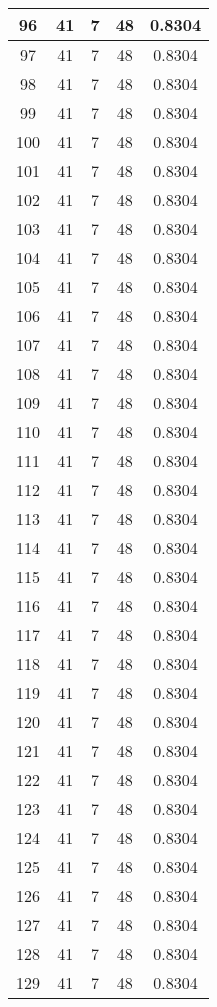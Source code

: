 \documentclass[letterpaper, 12pt]{article}
\begin{document}
\begin{longtable}{|c|c|c|c|c|}
\hline
96 & 41 & 7 & 48 & 0.8304 \\
\hline
97 & 41 & 7 & 48 & 0.8304 \\
\hline
98 & 41 & 7 & 48 & 0.8304 \\
\hline
99 & 41 & 7 & 48 & 0.8304 \\
\hline
100 & 41 & 7 & 48 & 0.8304 \\
\hline
101 & 41 & 7 & 48 & 0.8304 \\
\hline
102 & 41 & 7 & 48 & 0.8304 \\
\hline
103 & 41 & 7 & 48 & 0.8304 \\
\hline
104 & 41 & 7 & 48 & 0.8304 \\
\hline
105 & 41 & 7 & 48 & 0.8304 \\
\hline
106 & 41 & 7 & 48 & 0.8304 \\
\hline
107 & 41 & 7 & 48 & 0.8304 \\
\hline
108 & 41 & 7 & 48 & 0.8304 \\
\hline
109 & 41 & 7 & 48 & 0.8304 \\
\hline
110 & 41 & 7 & 48 & 0.8304 \\
\hline
111 & 41 & 7 & 48 & 0.8304 \\
\hline
112 & 41 & 7 & 48 & 0.8304 \\
\hline
113 & 41 & 7 & 48 & 0.8304 \\
\hline
114 & 41 & 7 & 48 & 0.8304 \\
\hline
115 & 41 & 7 & 48 & 0.8304 \\
\hline
116 & 41 & 7 & 48 & 0.8304 \\
\hline
117 & 41 & 7 & 48 & 0.8304 \\
\hline
118 & 41 & 7 & 48 & 0.8304 \\
\hline
119 & 41 & 7 & 48 & 0.8304 \\
\hline
120 & 41 & 7 & 48 & 0.8304 \\
\hline
121 & 41 & 7 & 48 & 0.8304 \\
\hline
122 & 41 & 7 & 48 & 0.8304 \\
\hline
123 & 41 & 7 & 48 & 0.8304 \\
\hline
124 & 41 & 7 & 48 & 0.8304 \\
\hline
125 & 41 & 7 & 48 & 0.8304 \\
\hline
126 & 41 & 7 & 48 & 0.8304 \\
\hline
127 & 41 & 7 & 48 & 0.8304 \\
\hline
128 & 41 & 7 & 48 & 0.8304 \\
\hline
129 & 41 & 7 & 48 & 0.8304 \\

\end{longtable}
\end{document}
